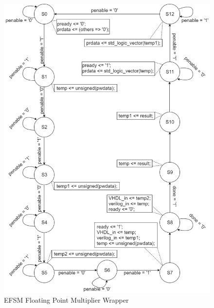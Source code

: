 \documentclass[]{IEEEtran}
\begin{document}
	
	
	
	
	\begin{figure}[bt]
		\centering
		\includegraphics[width=\textwidth]{figures/EFSM}
		\caption{EFSM Floating Point Multiplier Wrapper}
		\label{fig:efsm}
	\end{figure}
\end{document}
